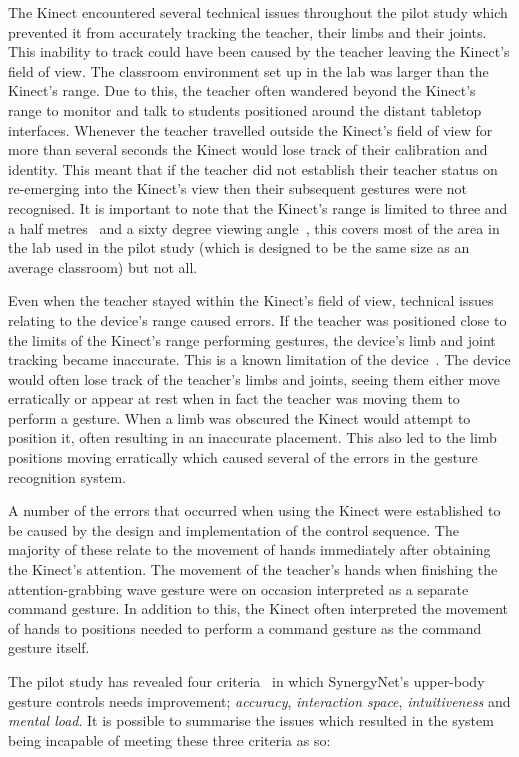 \documentclass[link]{IWCOMP}
\begin{document}
The Kinect encountered several technical issues throughout the pilot study which prevented it from accurately tracking the teacher, their limbs and their joints.
This inability to track could have been caused by the teacher leaving the Kinect's field of view.
The classroom environment set up in the lab was larger than the Kinect's range.
Due to this, the teacher often wandered beyond the Kinect's range to monitor and talk to students positioned around the distant tabletop interfaces.
Whenever the teacher travelled outside the Kinect's field of view for more than several seconds the Kinect would lose track of their calibration and identity.
This meant that if the teacher did not establish their teacher status on re-emerging into the Kinect's view then their subsequent gestures were not recognised.
It is important to note that the Kinect's range is limited to three and a half metres~\cite{Maimone2011} and a sixty degree viewing angle~\cite{Stone2011}, this covers most of the area in the lab used in the pilot study (which is designed to be the same size as an average classroom) but not all.

Even when the teacher stayed within the Kinect's field of view, technical issues relating to the device's range caused errors.
If the teacher was positioned close to the limits of the Kinect's range performing gestures, the device's limb and joint tracking became inaccurate.
This is a known limitation of the device~\cite{Mehrotra2011}.
The device would often lose track of the teacher's limbs and joints, seeing them either move erratically or appear at rest when in fact the teacher was moving them to perform a gesture.
When a limb was obscured the Kinect would attempt to position it, often resulting in an inaccurate placement.
This also led to the limb positions moving erratically which caused several of the errors in the gesture recognition system.

A number of the errors that occurred when using the Kinect were established to be caused by the design and implementation of the control sequence.
The majority of these relate to the movement of hands immediately after obtaining the Kinect's attention.
The movement of the teacher's hands when finishing the attention-grabbing wave gesture were on occasion interpreted as a separate command gesture.
In addition to this, the Kinect often interpreted the movement of hands to positions needed to perform a command gesture as the command gesture itself.

The pilot study has revealed four criteria~\cite{Wachs2011} in which SynergyNet's upper-body gesture controls needs improvement; 
\textit{accuracy}, \textit{interaction space}, \textit{intuitiveness} and \textit{mental load}.
It is possible to summarise the issues which resulted in the system being incapable of meeting these three criteria as so:
\end{document}
